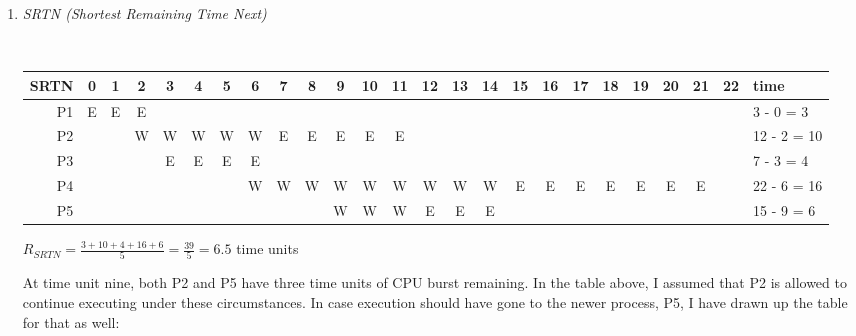 \documentclass[letterpaper,11pt]{article}
\begin{document}
\begin{enumerate}
\begin{enumerate}
\item \emph{SRTN (Shortest Remaining Time Next)}

\begin{center}\footnotesize
\tiny\tt
  \begin{tabular}{ r || c | c | c | c | c | c | c | c | c | c | c | c | c | c | c | c | c | c | c | c | c | c | c || l }
    \hline
    SRTN & 0 & 1 & 2 & 3 & 4 & 5 & 6 & 7 & 8 & 9 & 10 & 11 & 12 & 13 & 14 & 15 & 16 & 17 & 18 & 19 & 20 & 21 & 22 & time \\ \hline
    \hline
    P1   & E & E & E &   &   &   &   &   &   &   &    &    &    &    &    &    &    &    &    &    &    &    &    & 3 - 0 = 3 \\ \hline
    P2   &   &   & W & W & W & W & W & E & E & E & E  & E  &    &    &    &    &    &    &    &    &    &    &    & 12 - 2 = 10 \\ \hline
    P3   &   &   &   & E & E & E & E &   &   &   &    &    &    &    &    &    &    &    &    &    &    &    &    & 7 - 3 = 4 \\ \hline
    P4   &   &   &   &   &   &   & W & W & W & W & W  & W  & W  & W  & W  & E  & E  & E  & E  & E  & E  & E  &    & 22 - 6 = 16 \\ \hline
    P5   &   &   &   &   &   &   &   &   &   & W & W  & W  & E  & E  & E  &    &    &    &    &    &    &    &    & 15 - 9 = 6 \\ \hline
    \hline
  \end{tabular}
\end{center}
$R_{SRTN} = \frac{3 + 10 + 4 + 16 + 6}{5} = \frac{39}{5} = 6.5$ time units

At time unit nine, both P2 and P5 have three time units of CPU burst remaining.  In the table above, I assumed that P2 is allowed to continue executing under these circumstances.  In case execution should have gone to the newer process, P5, I have drawn up the table for that as well:


\end{enumerate}
\end{enumerate}
\end{document}
